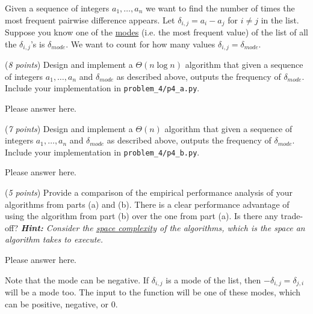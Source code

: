 \documentclass{hw}
\begin{document}
\newpage


\begin{problem}
  Given a sequence of integers $a_1,\ldots,a_n$ we want to find the
  number of times the most frequent pairwise difference appears.
  Let $\delta_{i, j} = a_i - a_j$ for $i \ne j$ in the list. Suppose you know one of the \href{https://en.wikipedia.org/wiki/Mode_(statistics)}{modes} (i.e. the most frequent value) of the list of all the $\delta_{i, j}$'s is $\delta_{mode}$. We want to count for how many values $\delta_{i, j} = \delta_{mode}$. 

  \begin{subproblem}
    (\textit{8 points})
    Design and implement a $\Theta(n \log n)$ algorithm that given a sequence of integers $a_1,\ldots,a_n$ and $\delta_{mode}$ as described above, outputs the frequency of $\delta_{mode}$. Include your implementation in \texttt{problem\_4/p4\_a.py}.
  \end{subproblem}
  
\begin{solution}
Please answer here.
\end{solution}
  
  \begin{subproblem}
    (\textit{7 points})
    Design and implement a $\Theta(n)$ algorithm that given a sequence of integers $a_1,\ldots,a_n$ and $\delta_{mode}$ as described above, outputs the frequency of $\delta_{mode}$. Include your implementation in \texttt{problem\_4/p4\_b.py}.
  \end{subproblem}

\begin{solution}
Please answer here.
\end{solution}
  
  \begin{subproblem}
    (\textit{5 points})
    Provide a comparison of the empirical performance analysis of your algorithms from parts (a) and (b). There is a clear performance advantage of using the algorithm from part (b) over the one from part (a). Is there any trade-off? \textit{\textbf{Hint:} Consider the \href{https://en.wikipedia.org/wiki/Space_complexity}{space complexity} of the algorithms, which is the space an algorithm takes to execute.}
  \end{subproblem}

\begin{solution}
Please answer here.
\end{solution}
  
  Note that the mode can be negative. If $\delta_{i, j}$ is a mode of the list,
  then $-\delta_{i, j} = \delta_{j, i}$ will be a mode too. The input to the
  function will be one of these modes, which can be positive, negative, or 0.
\end{problem}
\newpage
\end{document}
